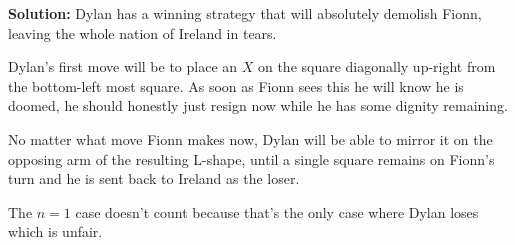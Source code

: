 \documentclass{article}
\begin{document}
\begin{enumerate}[itemsep=24pt]
\textbf{Solution:}
Dylan has a winning strategy that will absolutely demolish Fionn, leaving the whole nation of Ireland in tears. 

Dylan's first move will be to place an $X$ on the square diagonally up-right from the bottom-left most square. As soon as Fionn sees this he will know he is doomed, he should honestly just resign now while he has some dignity remaining.

No matter what move Fionn makes now, Dylan will be able to mirror it on the opposing arm of the resulting L-shape, until a single square remains on Fionn's turn and he is sent back to Ireland as the loser.

The $n=1$ case doesn't count because that's the only case where Dylan loses which is unfair.


\end{enumerate}
\end{document}
